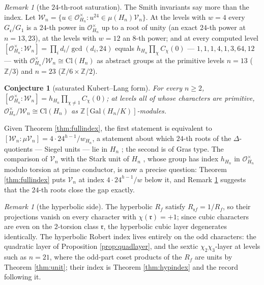 \documentclass[11pt]{amsart}
\numberwithin{equation}{section}
\theoremstyle{plain}
\newtheorem{conjecture}[theorem]{Conjecture}
\theoremstyle{definition}
\theoremstyle{remark}
\newtheorem{remark}[theorem]{Remark}
\newcommand{\Z}{\mathbb{Z}}
\newcommand{\Gal}{\mathrm{Gal}}
\newcommand{\Cl}{\mathrm{Cl}}
\newcommand{\idealc}{\mathfrak{c}}
\newcommand{\idealr}{\mathfrak{r}}
\newcommand{\Oc}{\mathcal{O}}
\begin{document}
\begin{remark}[the $24$-th-root saturation]\label{rem:saturation}
The Smith invariants say more than the index.  Let
$\mathcal{W}_n = \{u \in \Oc_{H_n}^\times : u^{24} \in \mu(H_n)\mathcal{V}_n\}$.
At the levels with $w = 4$ every $G_\idealc/G_1$ is a $24$-th power in
$\Oc_{H_n}^\times$ up to a root of unity (an exact $24$-th power at
$n = 13, 23$), at the levels with $w = 12$ an $8$-th power; and at every
computed level $[\Oc_{H_n}^\times:\mathcal{W}_n] = \prod_i d_i/\gcd(d_i,24)$
equals $h_{H_n}\prod_\chi C_\chi(0)$ --- $1, 1, 1, 4, 1, 3, 64, 12$ --- with
$\Oc_{H_n}^\times/\mathcal{W}_n \cong \Cl(H_n)$ as abstract groups at the primitive
levels $n = 13$ ($\Z/3$) and $n = 23$ ($\Z/6\times\Z/2$).
\end{remark}

\begin{conjecture}[saturated Kubert--Lang form]\label{conj:robert}
For every $n \ge 2$, $[\Oc_{H_n}^\times:\mathcal{W}_n] = h_{H_n}\prod_{\chi\ne1}C_\chi(0)$;
at levels all of whose characters are primitive,
$\Oc_{H_n}^\times/\mathcal{W}_n \cong \Cl(H_n)$ as $\Z[\Gal(H_n/K)]$-modules.
\end{conjecture}

Given Theorem \ref{thm:fullindex}, the first statement is equivalent to
$[\mathcal{W}_n:\mu\mathcal{V}_n] = 4\cdot24^{h-1}/w_{H_n}$, a statement about
which $24$-th roots of the $\Delta$-quotients --- Siegel units --- lie in
$H_n$ \cite[Ch.~11--12]{KubertLang1981}; the second is of Gras type.  The
comparison of $\mathcal{V}_n$ with the Stark unit of $H_n$
\cite{Stark1980, HajirVillegas1997}, whose group has index $h_{H_n}$ in
$\Oc_{H_n}^\times$ modulo torsion at prime conductor, is now a precise
question: Theorem \ref{thm:fullindex} puts $\mathcal{V}_n$ at index
$4\cdot24^{h-1}/w$ below it, and Remark \ref{rem:saturation} suggests that
the $24$-th roots close the gap exactly.

\begin{remark}[the hyperbolic side]\label{rem:hypindex}
The hyperbolic $R_f$ satisfy $R_{\idealr f} = 1/R_f$, so their
projections vanish on every character with $\chi(\idealr) = +1$; since
cubic characters are even on the $2$-torsion class $\idealr$, the
hyperbolic cubic layer degenerates identically.  The hyperbolic Robert
index lives entirely on the odd characters: the quadratic layer of
Proposition \ref{prop:quadlayer}, and the sextic $\chi_2\chi_3$-layer at
levels such as $n = 21$, where the odd-part coset products of the $R_f$
are units by Theorem \ref{thm:unit}; their index is Theorem
\ref{thm:hypindex} and the record following it.
\end{remark}
\end{document}
